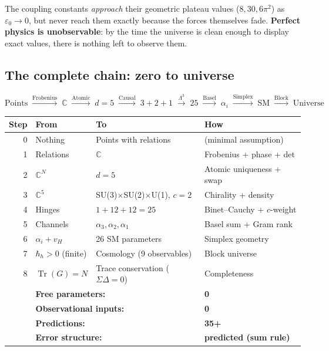 \documentclass[12pt]{article}
\theoremstyle{remark}
\theoremstyle{definition}
\newcommand{\tr}{\operatorname{Tr}}
\begin{document}
The coupling constants \emph{approach} their geometric plateau values ($8, 30, 6\pi^2$) as $\varepsilon_0 \to 0$, but never reach them exactly because the forces themselves fade. \textbf{Perfect physics is unobservable}: by the time the universe is clean enough to display exact values, there is nothing left to observe them.

\subsection{The complete chain: zero to universe}

\begin{equation}
\boxed{
\text{Points} \;\xrightarrow{\text{Frobenius}}\; \mathbb{C}
\;\xrightarrow{\text{Atomic}}\; d = 5
\;\xrightarrow{\text{Causal}}\; 3\!+\!2\!+\!1
\;\xrightarrow{\Lambda^3}\; 25
\;\xrightarrow{\text{Basel}}\; \alpha_i
\;\xrightarrow{\text{Simplex}}\; \text{SM}
\;\xrightarrow{\text{Block}}\; \text{Universe}
}
\end{equation}

\begin{center}
\begin{tabular}{rlll}
\hline
Step & From & To & How \\
\hline
0 & Nothing & Points with relations & (minimal assumption) \\
1 & Relations & $\mathbb{C}$ & Frobenius + phase + det \\
2 & $\mathbb{C}^N$ & $d = 5$ & Atomic uniqueness + swap \\
3 & $\mathbb{C}^5$ & SU(3)$\times$SU(2)$\times$U(1), $c\!=\!2$ & Chirality + density \\
4 & Hinges & $1 + 12 + 12 = 25$ & Binet--Cauchy + $c$-weight \\
5 & Channels & $\alpha_3, \alpha_2, \alpha_1$ & Basel sum + Gram rank \\
6 & $\alpha_i + v_H$ & 26 SM parameters & Simplex geometry \\
7 & $\hbar_h > 0$ (finite) & Cosmology (9 observables) & Block universe \\
8 & $\tr(G) = N$ & Trace conservation ($\Sigma\Delta = 0$) & Completeness \\
\hline
& \multicolumn{2}{l}{\textbf{Free parameters:}} & \textbf{0} \\
& \multicolumn{2}{l}{\textbf{Observational inputs:}} & \textbf{0} \\
& \multicolumn{2}{l}{\textbf{Predictions:}} & \textbf{35+} \\
& \multicolumn{2}{l}{\textbf{Error structure:}} & \textbf{predicted (sum rule)} \\
\hline
\end{tabular}
\end{center}
\end{document}
